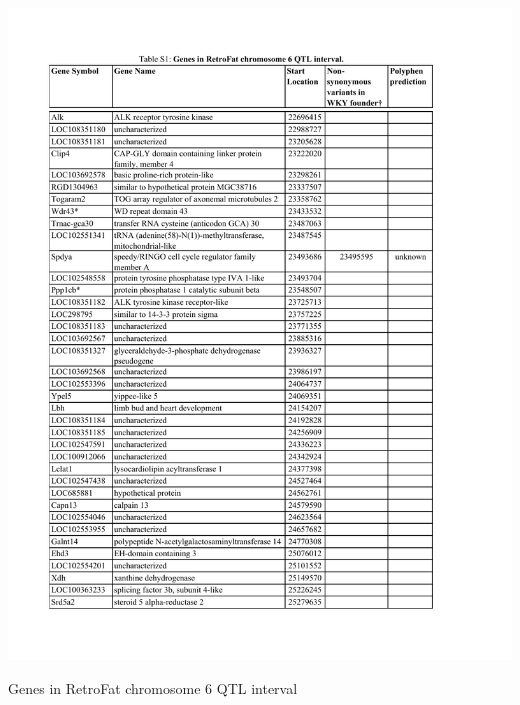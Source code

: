 \begin{table}
\centering
\includegraphics[page=1, trim={0in 0in 0in 0.95in}, clip, width=\textwidth]{figures/5-hsrats/supp_table_retrofat_chr6.pdf}
\caption{Genes in RetroFat chromosome 6 QTL interval \label{tab:retrofat_chr6_genes_1}}
\end{table}

\clearpage

